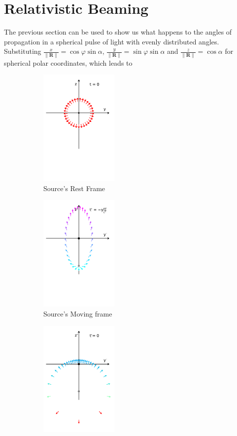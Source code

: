 \section{Relativistic Beaming}

The previous section can be used to show us what happens to the angles of propagation in a spherical pulse of light with evenly distributed angles.
Substituting $\frac{x}{\|\mathbf{R}\|}= \cos{\varphi}\sin{\alpha}$, $\frac{y}{\|\mathbf{R}\|} = \sin{\varphi}\sin{\alpha}$ and $ \frac{z}{\|\mathbf{R}\|} = \cos{\alpha}$ for spherical polar coordinates, which leads to

\begin{figure}[H]
	\begin{subfigure}{.32\textwidth}
		\centering
		\includegraphics[width=3.8cm]{images/pdf/Rest_Pulse.pdf}
		\caption{Source's Rest Frame}
	\end{subfigure}
	\begin{subfigure}{.32\textwidth}
		\centering
		\includegraphics[width=3.8cm]{images/pdf/Prime_Pulse.pdf}
		\caption{Source's Moving frame}
	\end{subfigure}
	\begin{subfigure}{.32\textwidth}
		\centering
		\includegraphics[width=3.8cm]{images/pdf/Prime_Pulse_Simultaneous.pdf}

\end{subfigure}
\end{figure}
